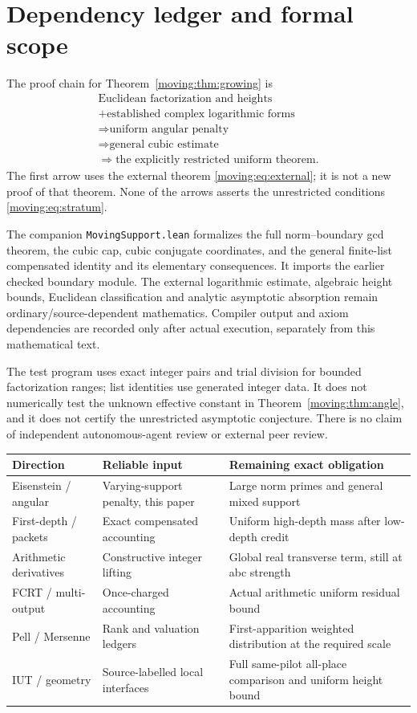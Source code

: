 \section{Dependency ledger and formal scope}
The proof chain for Theorem~\ref{moving:thm:growing} is
\[
 \begin{gathered}
 \text{Euclidean factorization and heights}\\
 +\text{established complex logarithmic forms}\\
 \Longrightarrow\text{uniform angular penalty}\\
 \Longrightarrow\text{general cubic estimate}\\
 \Longrightarrow\text{the explicitly restricted uniform theorem}.
 \end{gathered}
\]
The first arrow uses the external theorem \eqref{moving:eq:external}; it is not a new proof of that theorem. None of the arrows asserts the unrestricted conditions \eqref{moving:eq:stratum}.

The companion \texttt{MovingSupport.lean} formalizes the full norm--boundary gcd theorem, the cubic cap, cubic conjugate coordinates, and the general finite-list compensated identity and its elementary consequences. It imports the earlier checked boundary module. The external logarithmic estimate, algebraic height bounds, Euclidean classification and analytic asymptotic absorption remain ordinary/source-dependent mathematics. Compiler output and axiom dependencies are recorded only after actual execution, separately from this mathematical text.

The test program uses exact integer pairs and trial division for bounded factorization ranges; list identities use generated integer data. It does not numerically test the unknown effective constant in Theorem~\ref{moving:thm:angle}, and it does not certify the unrestricted asymptotic conjecture. There is no claim of independent autonomous-agent review or external peer review.

\begin{center}\small
\begin{tabular}{p{}p{}p{}}
\toprule
Direction & Reliable input & Remaining exact obligation\\\midrule
Eisenstein / angular & Varying-support penalty, this paper & Large norm primes and general mixed support\\
First-depth / packets & Exact compensated accounting & Uniform high-depth mass after low-depth credit\\
Arithmetic derivatives & Constructive integer lifting & Global real transverse term, still at abc strength\\
FCRT / multi-output & Once-charged accounting & Actual arithmetic uniform residual bound\\
Pell / Mersenne & Rank and valuation ledgers & First-apparition weighted distribution at the required scale\\
IUT / geometry & Source-labelled local interfaces & Full same-pilot all-place comparison and uniform height bound\\\bottomrule
\end{tabular}
\end{center}

